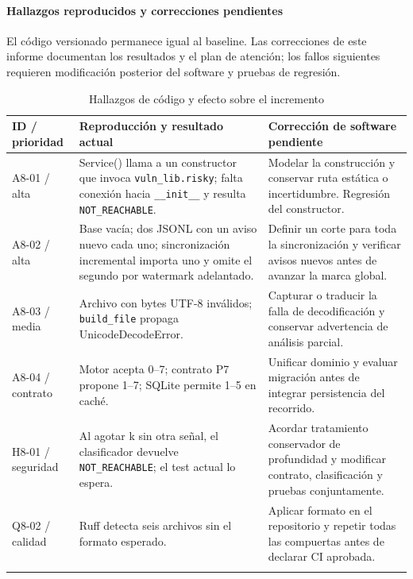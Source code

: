 \paragraph*{Hallazgos reproducidos y correcciones pendientes}
El código versionado permanece igual al baseline. Las correcciones de este informe documentan los resultados y el plan de atención; los fallos siguientes requieren modificación posterior del software y pruebas de regresión.
\begin{table}[H]
\centering\small{}
\caption{Hallazgos de código y efecto sobre el incremento}
\begin{tabularx}{\textwidth}{P{2.2cm}YY}
\toprule
\textbf{ID / prioridad} & \textbf{Reproducción y resultado actual} & \textbf{Corrección de software pendiente} \\
\midrule
A8-01 / alta & Service() llama a un constructor que invoca \texttt{vuln\_\allowbreak lib.\allowbreak risky}; falta conexión hacia \texttt{\_\allowbreak \_\allowbreak init\_\allowbreak \_\allowbreak } y resulta \texttt{NOT\_\allowbreak REACHABLE}. & Modelar la construcción y conservar ruta estática o incertidumbre. Regresión del constructor. \\
\addlinespace
A8-02 / alta & Base vacía; dos JSONL con un aviso nuevo cada uno; sincronización incremental importa uno y omite el segundo por watermark adelantado. & Definir un corte para toda la sincronización y verificar avisos nuevos antes de avanzar la marca global. \\
\addlinespace
A8-03 / media & Archivo con bytes UTF-8 inválidos; \texttt{build\_\allowbreak file} propaga UnicodeDecodeError. & Capturar o traducir la falla de decodificación y conservar advertencia de análisis parcial. \\
\addlinespace
A8-04 / contrato & Motor acepta 0--7; contrato P7 propone 1--7; SQLite permite 1--5 en caché. & Unificar dominio y evaluar migración antes de integrar persistencia del recorrido. \\
\addlinespace
H8-01 / seguridad & Al agotar k sin otra señal, el clasificador devuelve \texttt{NOT\_\allowbreak REACHABLE}; el test actual lo espera. & Acordar tratamiento conservador de profundidad y modificar contrato, clasificación y pruebas conjuntamente. \\
\addlinespace
Q8-02 / calidad & Ruff detecta seis archivos sin el formato esperado. & Aplicar formato en el repositorio y repetir todas las compuertas antes de declarar CI aprobada. \\
\addlinespace
\bottomrule
\end{tabularx}
\end{table}
